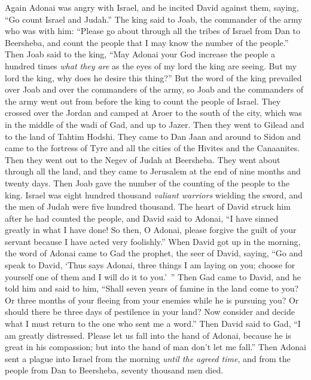 \begin{biblechapter} %
 Again Adonai was angry with Israel, and he incited David against them, saying, “Go count Israel and Judah.”
\verse The king said to Joab, the commander of the army who was with him: “Please go about through all the tribes of Israel from Dan to Beersheba, and count the people that I may know the number of the people.”
\verse Then Joab said to the king, “May Adonai your God increase the people a hundred times \textit{what they are} as the eyes of my lord the king are seeing. But my lord the king, why does he desire this thing?”
\verse But the word of the king prevailed over Joab and over the commanders of the army, so Joab and the commanders of the army went out from before the king to count the people of Israel.
\verse They crossed over the Jordan and camped at Aroer to the south of the city, which was in the middle of the wadi of Gad, and up to Jazer.
\verse Then they went to Gilead and to the land of Tahtim Hodshi. They came to Dan Jaan and around to Sidon
\verse and came to the fortress of Tyre and all the cities of the Hivites and the Canaanites. Then they went out to the Negev of Judah at Beersheba.
\verse They went about through all the land, and they came to Jerusalem at the end of nine months and twenty days.
\verse Then Joab gave the number of the counting of the people to the king. Israel was eight hundred thousand \textit{valiant warriors} wielding the sword, and the men of Judah were five hundred thousand.
\verse The heart of David struck him after he had counted the people, and David said to Adonai, “I have sinned greatly in what I have done! So then, O Adonai, please forgive the guilt of your servant because I have acted very foolishly.”
\verse When David got up in the morning, the word of Adonai came to Gad the prophet, the seer of David, saying,
\verse “Go and speak to David, ‘Thus says Adonai, three things I am laying on you; choose for yourself one of them and I will do it to you.’ ”
\verse Then Gad came to David, and he told him and said to him, “Shall seven years of famine in the land come to you? Or three months of your fleeing from your enemies while he is pursuing you? Or should there be three days of pestilence in your land? Now consider and decide what I must return to the one who sent me a word.”
\verse Then David said to Gad, “I am greatly distressed. Please let us fall into the hand of Adonai, because he is great in his compassion; but into the hand of man don’t let me fall.”
\verse Then Adonai sent a plague into Israel from the morning \textit{until the agreed time}, and from the people from Dan to Beersheba, seventy thousand men died.

\end{biblechapter}
